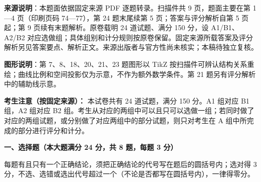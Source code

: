 


\begin{gktip}
\textbf{来源说明}：本题面依据固定来源 PDF 逐题转录。扫描件共 9 页，题面主要在第 1—4 页（印刷页码 74—77），第 24 题末尾续第 5 页；答案与评分解析自第 5 页起；第 9 页续有末题解析。原卷载明 24 道试题、满分 150 分，设 A1/B1、A2/B2 对应选做组；具体组别和计分规则按原卷保留。固定来源所载答案及评分解析另见答案要点、解析正文。来源出版者与官方性尚未核实；本稿待独立复核。

\textbf{图形说明}：第 7、8、18、20、21、23 题图形以 TikZ 按扫描件可辨认结构关系重绘；曲线比例和空间投影仅为示意，不作为额外数学条件。第 21 题另有评分解析中的辅助线示意。
\end{gktip}

\textbf{考生注意（按固定来源）：} 本试卷共有 24 道试题，满分 150 分。A1 组对应 B1 组，A2 组对应 B2 组。考生从对应的两组中可以且只可以选做一组；若同时做了对应的两组试题，或分别做了对应两组中的部分试题，则只对考生在 A 组中所完成的部分进行评分和计分。

\textbf{一、选择题（本大题满分 24 分，共 8 题，每题 3 分）}

每题有且只有一个正确结论，须把正确结论的代号写在题后的圆括号内；选对得 3 分，不选、选错或选出代号超过一个（不论是否都写在圆括号内），一律得零分。

